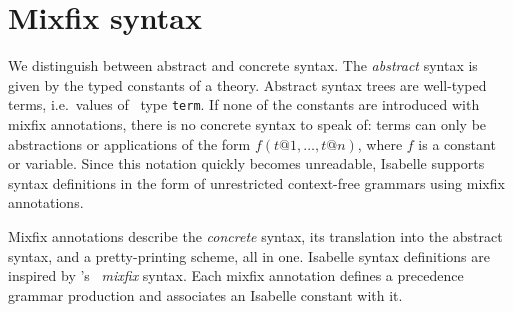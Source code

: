 \section{Mixfix syntax}

We distinguish between abstract and concrete syntax.  The {\em abstract}
syntax is given by the typed constants of a theory.  Abstract syntax trees are
well-typed terms, i.e.\ values of \ML\ type {\tt term}.  If none of the
constants are introduced with mixfix annotations, there is no concrete syntax
to speak of: terms can only be abstractions or applications of the form
$f(t@1,\dots,t@n)$, where $f$ is a constant or variable.  Since this notation
quickly becomes unreadable, Isabelle supports syntax definitions in the form
of unrestricted context-free grammars using mixfix annotations.

Mixfix annotations describe the {\em concrete} syntax, its translation into
the abstract syntax, and a pretty-printing scheme, all in one.  Isabelle
syntax definitions are inspired by \OBJ's~\cite{OBJ} {\em mixfix\/} syntax.
Each mixfix annotation defines a precedence grammar production and associates
an Isabelle constant with it.

